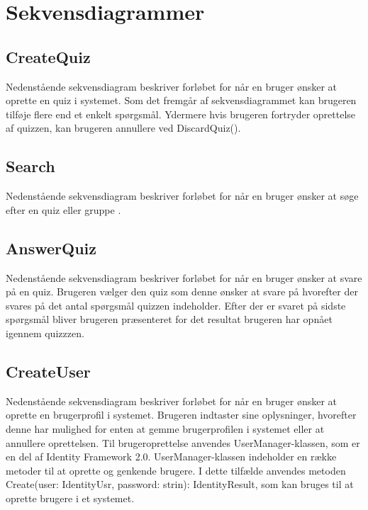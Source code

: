 \section{Sekvensdiagrammer}

\subsection*{CreateQuiz}
Nedenstående sekvensdiagram beskriver forløbet for når en bruger ønsker at oprette en quiz i systemet. Som det fremgår af sekvensdiagrammet kan brugeren tilføje flere end et enkelt spørgsmål. Ydermere hvis brugeren fortryder oprettelse af quizzen, kan brugeren annullere ved DiscardQuiz().


\subsection*{Search}
Nedenstående sekvensdiagram beskriver forløbet for når en bruger ønsker at søge efter en quiz eller gruppe .


\subsection*{AnswerQuiz}
Nedenstående sekvensdiagram beskriver forløbet for når en bruger ønsker at svare på en quiz. Brugeren vælger den quiz som denne ønsker at svare på hvorefter der svares på det antal spørgsmål quizzen indeholder. Efter der er svaret på sidste spørgsmål bliver brugeren præsenteret for det resultat brugeren har opnået igennem quizzzen.


\subsection*{CreateUser}
Nedenstående sekvensdiagram beskriver forløbet for når en bruger ønsker at oprette en brugerprofil i systemet. Brugeren indtaster sine oplysninger, hvorefter denne har mulighed for enten at gemme brugerprofilen i systemet eller at annullere oprettelsen. Til brugeroprettelse anvendes UserManager-klassen, som er en del af Identity Framework 2.0. UserManager-klassen indeholder en række metoder til at oprette og genkende brugere. I dette tilfælde anvendes metoden Create(user: IdentityUsr, password: strin): IdentityResult, som kan bruges til at oprette brugere i et systemet.

